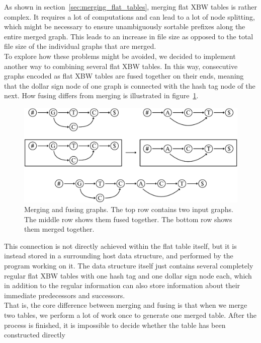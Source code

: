 \documentclass[a4paper,12pt,twoside,BCOR=10mm]{scrbook}
\begin{document}
As shown in section~\ref{sec:merging_flat_tables}, merging flat XBW tables is rather complex. 
It requires a lot of computations and can lead to a lot of node splitting, 
which might be necessary to ensure unambiguously sortable prefixes along the entire merged graph. 
This leads to an increase in file size as opposed to the total file 
size of the individual graphs that are merged. \\
To explore how these problems might be avoided, 
we decided to implement another way to combining several flat XBW tables. 
In this way, consecutive graphs encoded as flat XBW tables are fused together on their ends, 
meaning that the dollar sign node of one graph is connected with the hash tag node of the next. 
How fusing differs from merging is illustrated in figure~\ref{fig:evo_fig_merge_fuse_diffy}. 
\begin{figure}[!htb]
\centering
\includegraphics[width=\textwidth]{evo_fig_merge_fuse_diffy.pdf}
\caption[Merging and fusing graphs]{Merging and fusing graphs. The top row contains two input graphs. The middle row shows them fused together. The bottom row shows them merged together.} \label{fig:evo_fig_merge_fuse_diffy}
\end{figure}
This connection is not directly achieved within the flat table itself, 
but it is instead stored in a surrounding host data structure, 
and performed by the program working on it. 
The data structure itself just contains several completely regular flat XBW tables with 
one hash tag and one dollar sign node each, which in addition to the regular information 
can also store information about their immediate predecessors and successors. \\
That is, the core difference between merging and 
fusing is that when we merge two tables, we perform a lot of work once 
to generate one merged table. After the process is finished, 
it is impossible to decide whether the table has been constructed directly 
\end{document}
